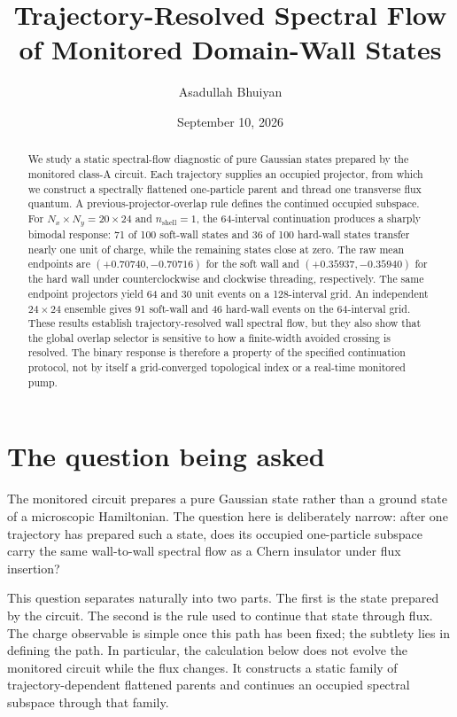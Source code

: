 \documentclass[aps,prb,twocolumn,floatfix,nofootinbib,superscriptaddress]{revtex4-2}
\begin{document}
\title{Trajectory-Resolved Spectral Flow of Monitored Domain-Wall States}
\author{Asadullah Bhuiyan}
\date{September 10, 2026}

\begin{abstract}
We study a static spectral-flow diagnostic of pure Gaussian states prepared by
the monitored class-A circuit.  Each trajectory supplies an occupied
projector, from which we construct a spectrally flattened one-particle parent
and thread one transverse flux quantum.  A previous-projector-overlap rule
defines the continued occupied subspace.  For $N_x\times N_y=20\times24$ and
$n_{\mathrm{shell}}=1$, the 64-interval continuation produces a sharply bimodal
response: 71 of 100 soft-wall states and 36 of 100 hard-wall states transfer
nearly one unit of charge, while the remaining states close at zero.  The raw
mean endpoints are $(+0.70740,-0.70716)$ for the soft wall and
$(+0.35937,-0.35940)$ for the hard wall under counterclockwise and clockwise
threading, respectively.  The same endpoint projectors yield 64 and 30 unit
events on a 128-interval grid.  An independent $24\times24$ ensemble gives 91
soft-wall and 46 hard-wall events on the 64-interval grid.  These results
establish trajectory-resolved wall spectral flow, but they also show that the
global overlap selector is sensitive to how a finite-width avoided crossing is
resolved.  The binary response is therefore a property of the specified
continuation protocol, not by itself a grid-converged topological index or a
real-time monitored pump.
\end{abstract}

\maketitle

\section{The question being asked}

The monitored circuit prepares a pure Gaussian state rather than a ground
state of a microscopic Hamiltonian.  The question here is deliberately
narrow: after one trajectory has prepared such a state, does its occupied
one-particle subspace carry the same wall-to-wall spectral flow as a Chern
insulator under flux insertion?

This question separates naturally into two parts.  The first is the state
prepared by the circuit.  The second is the rule used to continue that state
through flux.  The charge observable is simple once this path has been fixed;
the subtlety lies in defining the path.  In particular, the calculation below
does not evolve the monitored circuit while the flux changes.  It constructs a
static family of trajectory-dependent flattened parents and continues an
occupied spectral subspace through that family.
\end{document}
